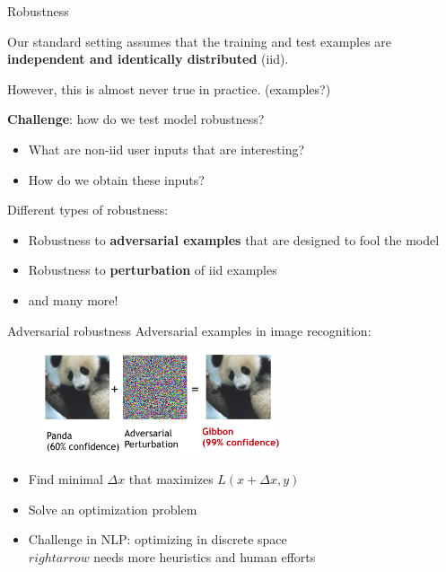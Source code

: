 \documentclass[usenames,dvipsnames,notes,11pt,aspectratio=169,hyperref={colorlinks=true, linkcolor=blue}]{beamer}
\begin{document}
\begin{frame}
    {Robustness}

    Our standard setting assumes that the training and test examples are \textbf{independent and identically distributed} (iid).

    However, this is almost never true in practice. (examples?)
    \pause

    \textbf{Challenge}: how do we test model robustness?\\
    \begin{itemize}
        \item What are non-iid user inputs that are interesting? 
        \item How do we obtain these inputs?
    \end{itemize}
    \pause

    Different types of robustness:\\
    \begin{itemize}
        \item Robustness to \textbf{adversarial examples} that are designed to fool the model
        \item Robustness to \textbf{perturbation} of iid examples
        \item and many more!
    \end{itemize}
\end{frame}

\begin{frame}
    {Adversarial robustness}
    Adversarial examples in image recognition:
    \begin{figure}
        \includegraphics[height=3cm]{figures/advex}
    \end{figure}
    \begin{itemize}
        \item Find minimal $\Delta x$ that maximizes $L(x+\Delta x, y)$ 
        \item Solve an optimization problem
        \item Challenge in NLP: optimizing in discrete space\\
            $rightarrow$ needs more heuristics and human efforts
    \end{itemize}
\end{frame}
\end{document}
